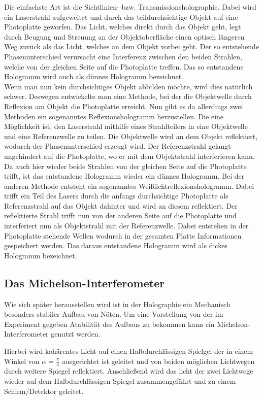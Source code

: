 Die einfachste Art ist die Sichtlinien- bzw. Transmissionsholographie. Dabei wird ein Laserstrahl aufgeweitet und durch das teildurchsichtige Objekt auf eine Photoplatte geworfen. Das Licht, welches direkt durch das Objekt geht, legt durch Beugung und Streuung an der Objektoberfläche einen optisch längeren Weg zurück als das Licht, welches an dem Objekt vorbei geht. Der so entstehende Phasenunterschied verursacht eine Interferenz zwischen den beiden Strahlen, welche von der gleichen Seite auf die Photoplatte treffen. Das so entstandene Hologramm wird auch als dünnes Hologramm bezeichnet.\\

Wenn man nun kein durchsichtiges Objekt abbilden möchte, wird dies natürlich schwer. Deswegen entwickelte man eine Methode, bei der die Objektwelle durch Reflexion am Objekt die Photoplatte erreicht. Nun gibt es da allerdings zwei Methoden ein sogenanntes Reflexionshologramm herzustellen.
Die eine Möglichkeit ist, den Laserstrahl mithilfe eines Strahlteilers in eine Objektwelle und eine Referenzwelle zu teilen. Die Objektwelle wird an dem Objekt reflektiert, wodurch der Phasenunterschied erzeugt wird. Der Referenzstrahl gelangt ungehindert auf die Photoplatte, wo er mit dem Objektstrahl interferieren kann. Da auch hier wieder beide Strahlen von der gleichen Seite auf die Photoplatte trifft, ist das entstandene Hologramm wieder ein dünnes Hologramm.
Bei der anderen Methode entsteht ein sogenanntes Weißlichtreflexionshologramm. Dabei trifft ein Teil des Lasers durch die anfangs durchsichtige Photoplatte als Referenzstrahl auf das Objekt dahinter und wird an diesem reflektiert. Der reflektierte Strahl trifft nun von der anderen Seite auf die Photoplatte und interferiert nun als Objektstrahl mit der Referenzwelle. Dabei entstehen in der Photoplatte stehende Wellen wodurch in der gesamten Platte Informationen gespeichert werden. Das daraus entstandene Hologramm wird als dickes Hologramm bezeichnet.

\subsection{Das Michelson-Interferometer}
Wie sich später herausstellen wird ist in der Holographie ein Mechanisch besonders stabiler Aufbau von Nöten. Um eine Vorstellung von der im Experiment gegeben Atabilität des Aufbaus zu bekommen kann ein Michelson-Interferometer genutzt werden. 

Hierbei wird kohärentes Licht auf einen Halbdurchlässigen Spielgel der in einem Winkel von $\alpha = \frac{\pi}{4}$ ausgerichtet ist geleitet und von beiden möglichen Lichtwegen durch weitere Spiegel reflektiert. Anschließend wird das licht der zwei Lichtwege wieder auf dem Halbdurchlässigen Spiegel zusammengeführt und zu einem Schirm/Detektor geleitet.


